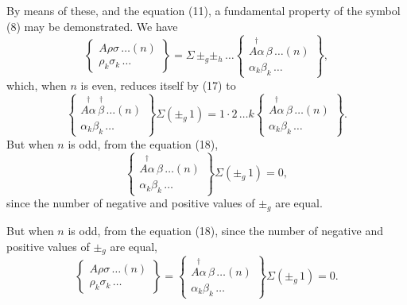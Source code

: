 \documentclass[11pt,a4paper]{article}
\theoremstyle{plain}
\theoremstyle{definition}
\theoremstyle{remark}
\begin{document}
By means of these, and the equation (11), a fundamental property of the symbol
(8) may be demonstrated. We have
\[
\left\{
\begin{array}{c}
A\rho\sigma\,\ldots(n) \\[2pt]
\hline
\rho_k\sigma_k\,\ldots
\end{array}
\right\}
= \Sigma\,\pm_g\pm_h\,\ldots
\left\{
\begin{array}{c}
\stackrel{\dagger}{A\alpha}\,\beta\,\ldots(n) \\[2pt]
\hline
\alpha_k\beta_k\,\ldots
\end{array}
\right\}
\tag{19},
\]
which, when $n$ is even, reduces itself by (17) to
\[
\left\{
\begin{array}{c}
\stackrel{\dagger}{A\alpha}\,\stackrel{\dagger}{\beta}\,\ldots(n) \\[2pt]
\hline
\alpha_k\beta_k\,\ldots
\end{array}
\right\}
\Sigma(\pm_g\,1)
=1\cdot 2\,\ldots k
\left\{
\begin{array}{c}
\stackrel{\dagger}{A\alpha}\,\beta\,\ldots(n) \\[2pt]
\hline
\alpha_k\beta_k\,\ldots
\end{array}
\right\}
\tag{20}.
\]
But when $n$ is odd, from the equation (18),
\[
\left\{
\begin{array}{c}
\stackrel{\dagger}{A\alpha}\,\beta\,\ldots(n) \\[2pt]
\hline
\alpha_k\beta_k\,\ldots
\end{array}
\right\}
\Sigma(\pm_g\,1) = 0
\tag{21},
\]
since the number of negative and positive values of $\pm_g$ are equal.

\newpage

But when $n$ is odd, from the equation (18), since the number of negative and positive
values of $\pm_g$ are equal,
\[
\left\{
\begin{array}{c}
A\rho\sigma\,\ldots(n) \\[2pt]
\hline
\rho_k\sigma_k\,\ldots
\end{array}
\right\}
=
\left\{
\begin{array}{c}
\stackrel{\dagger}{A\alpha}\,\beta\,\ldots(n) \\[2pt]
\hline
\alpha_k\beta_k\,\ldots
\end{array}
\right\}
\Sigma(\pm_g\,1)=0
\tag{21}.
\]
\end{document}
